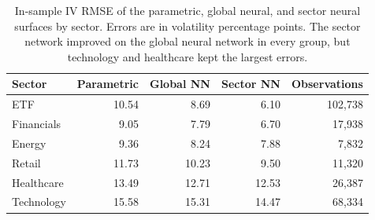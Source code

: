 \begin{table}[H]
\centering
\caption{Sector assignment of the 31 tickers across the fifteen snapshots. Counts are the filtered observations used in fitting.}\label{tab:sector_map}
\end{table}

\begin{table}[H]
\centering
\caption{In-sample IV RMSE of the parametric, global neural, and sector neural surfaces by sector. Errors are in volatility percentage points. The sector network improved on the global neural network in every group, but technology and healthcare kept the largest errors.}\label{tab:per_sector}
\begin{tabular}{lrrrr}
\toprule
Sector & Parametric & Global NN & Sector NN & Observations \\
\midrule
ETF        & 10.54 &  8.69 &  6.10 & 102{,}738 \\
Financials &  9.05 &  7.79 &  6.70 &  17{,}938 \\
Energy     &  9.36 &  8.24 &  7.88 &   7{,}832 \\
Retail     & 11.73 & 10.23 &  9.50 &  11{,}320 \\
Healthcare & 13.49 & 12.71 & 12.53 &  26{,}387 \\
Technology & 15.58 & 15.31 & 14.47 &  68{,}334 \\
\bottomrule
\end{tabular}
\end{table}


